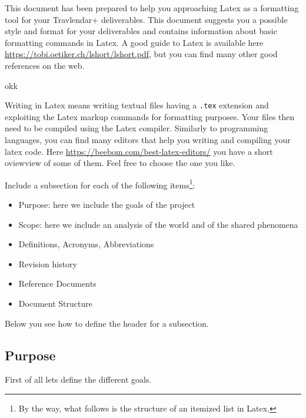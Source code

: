 This document has been prepared to help you approaching Latex as a formatting tool for your Travlendar+ deliverables. This document suggests you a possible style and format for your deliverables and contains information about basic formatting commands in Latex. A good guide to Latex is available here \href{https://tobi.oetiker.ch/lshort/lshort.pdf}{https://tobi.oetiker.ch/lshort/lshort.pdf}, but you can find many other good references on the web. 

okk

Writing in Latex means writing textual files having a \texttt{.tex} extension and exploiting the Latex markup commands for formatting purposes. Your files then need to be compiled using the Latex compiler. Similarly to programming languages, you can find many editors that help you writing and compiling your latex code. Here \href{https://beebom.com/best-latex-editors/}{https://beebom.com/best-latex-editors/} you have a short oviewview of some of them. Feel free to choose the one you like.  

Include a subsection for each of the following items\footnote{By the way, what follows is the structure of an itemized list in Latex.}:
\begin{itemize}
\item
Purpose: here we include the goals of the project
\item
Scope: here we include an analysis of the world and of the shared phenomena
\item
Definitions, Acronyms, Abbreviations
\item
Revision history
\item
Reference Documents 
\item
Document Structure
\end{itemize}
Below you see how to define the header for a subsection.
\subsection{Purpose}
First of all lets define the different goals.

